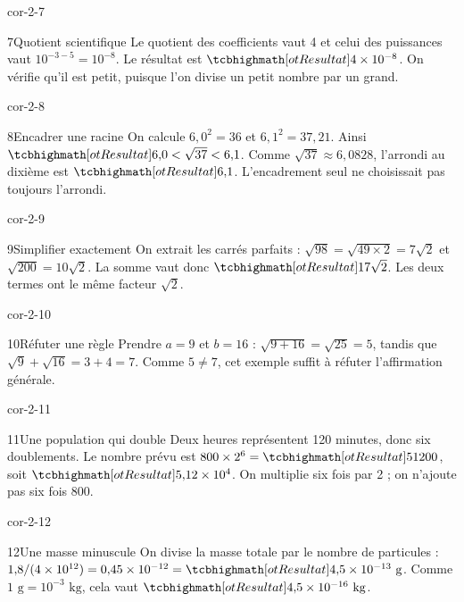 \begin{blocLivre}{cor-2-7}\begin{corrige}{7}{Quotient scientifique}
Le quotient des coefficients vaut 4 et celui des puissances vaut $10^{-3-5}=10^{-8}$. Le résultat est $\res{4\times10^{-8}}$. On vérifie qu’il est petit, puisque l’on divise un petit nombre par un grand.
\end{corrige}\end{blocLivre}
\begin{blocLivre}{cor-2-8}\begin{corrige}{8}{Encadrer une racine}
On calcule $6{,}0^2=36$ et $6{,}1^2=37{,}21$. Ainsi $\res{6{,}0<\sqrt{37}<6{,}1}$. Comme $\sqrt{37}\approx6{,}0828$, l’arrondi au dixième est $\res{6{,}1}$. L’encadrement seul ne choisissait pas toujours l’arrondi.
\end{corrige}\end{blocLivre}
\begin{blocLivre}{cor-2-9}\begin{corrige}{9}{Simplifier exactement}
On extrait les carrés parfaits : $\sqrt{98}=\sqrt{49\times2}=7\sqrt2$ et $\sqrt{200}=10\sqrt2$. La somme vaut donc $\res{17\sqrt2}$. Les deux termes ont le même facteur $\sqrt2$.
\end{corrige}\end{blocLivre}
\begin{blocLivre}{cor-2-10}\begin{corrige}{10}{Réfuter une règle}
Prendre $a=9$ et $b=16$ : $\sqrt{9+16}=\sqrt{25}=5$, tandis que $\sqrt9+\sqrt{16}=3+4=7$. Comme $5\ne7$, cet exemple suffit à réfuter l’affirmation générale.
\end{corrige}\end{blocLivre}
\begin{blocLivre}{cor-2-11}\begin{corrige}{11}{Une population qui double}
Deux heures représentent 120 minutes, donc six doublements. Le nombre prévu est $800\times2^6=\res{51200}$, soit $\res{5{,}12\times10^4}$. On multiplie six fois par 2 ; on n’ajoute pas six fois 800.
\end{corrige}\end{blocLivre}
\begin{blocLivre}{cor-2-12}\begin{corrige}{12}{Une masse minuscule}
On divise la masse totale par le nombre de particules : $1{,}8/(4\times10^{12})=0{,}45\times10^{-12}=\res{4{,}5\times10^{-13}\text{ g}}$. Comme $1\text{ g}=10^{-3}\text{ kg}$, cela vaut $\res{4{,}5\times10^{-16}\text{ kg}}$.
\end{corrige}\end{blocLivre}
